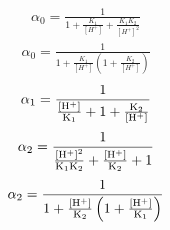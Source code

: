 \documentclass[letterpaper,10pt,english]{sphinxmanual}
\begin{document}
\begin{equation}\label{equation:Rapid_Mix/RM_Derivations:Rapid_Mix/RM_Derivations:9}
\begin{split}{\alpha_{\text{0}}} = \frac{1}{{1 + \frac{{{K_1}}}{{[{H^ + }]}} + \frac{{{K_1}{K_2}}}{{{{[{H^ + }]}^2}}}}}\end{split}
\end{equation}\begin{equation}\label{equation:Rapid_Mix/RM_Derivations:Rapid_Mix/RM_Derivations:10}
\begin{split}{\alpha_{\text{0}}} = \frac{1}{{1 + \frac{{{K_1}}}{{[{H^ + }]}}\left( {1 + \frac{{{K_2}}}{{[{H^ + }]}}} \right)}}\end{split}
\end{equation}\begin{equation}\label{equation:Rapid_Mix/RM_Derivations:Rapid_Mix/RM_Derivations:11}
\begin{split}{\alpha_{\text{1}}} = \frac{1}{{\frac{{[{{\rm H}^ + }]}}{{{{\rm K}_1}}} + 1 + \frac{{{{\rm K}_2}}}{{[{{\rm H}^ + }]}}}}\end{split}
\end{equation}\begin{equation}\label{equation:Rapid_Mix/RM_Derivations:Rapid_Mix/RM_Derivations:12}
\begin{split}{\alpha_{\text{2}}} = \frac{1}{{\frac{{{{[{{\rm H}^ + }]}^2}}}{{{{\rm K}_1}{{\rm K}_2}}} + \frac{{[{{\rm H}^ + }]}}{{{{\rm K}_2}}} + 1}}\end{split}
\end{equation}\begin{equation}\label{equation:Rapid_Mix/RM_Derivations:Rapid_Mix/RM_Derivations:13}
\begin{split}{\alpha_{\text{2}}} = \frac{1}{{1 + \frac{{[{{\rm H}^ + }]}}{{{{\rm K}_2}}}\left( {1 + \frac{{[{{\rm H}^ + }]}}{{{{\rm K}_1}}}} \right)}}\end{split}
\end{equation}
\end{document}
